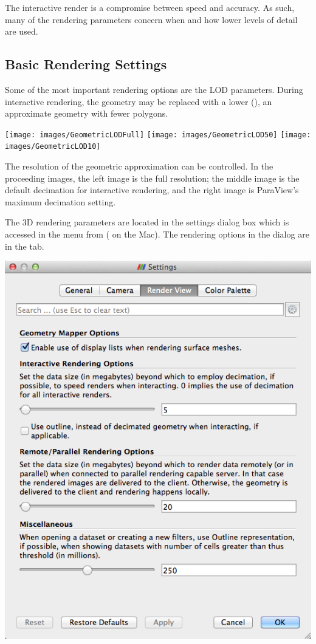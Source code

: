 The interactive render is a compromise between speed and accuracy.  As
such, many of the rendering parameters concern when and how lower levels of
detail are used.

\subsection{Basic Rendering Settings}
\label{sec:BasicRenderingSettings}

Some of the most important rendering options are the LOD parameters.
During interactive rendering, the geometry may be replaced with a lower
 (), an approximate geometry with
fewer polygons.

\begin{inlinefig}
  \texttt{[image: images/GeometricLODFull]}
  \texttt{[image: images/GeometricLOD50]}
  \texttt{[image: images/GeometricLOD10]}
\end{inlinefig}

The resolution of the geometric approximation can be controlled. In the
proceeding images, the left image is the full resolution; the middle image
is the default decimation for interactive rendering, and the right image is
ParaView's maximum decimation setting.

The 3D rendering parameters are located in the settings dialog box which is
accessed in the menu from  \ra {} ( \ra
{} on the Mac).  The rendering options in the dialog
are in the  tab.

\begin{inlinefig}
  \includegraphics[width=0.8\scw]{images/SettingsRendering}
\end{inlinefig}

